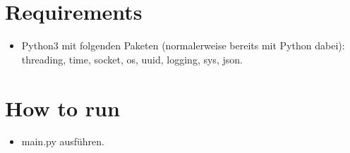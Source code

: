 

\newcommand{\dozent}{Prof. Dr. Matthias Wählisch, Marcin Nawrocki, M.Sc.}
\newcommand{\tutor}{-}
\newcommand{\tutoriumNo}{01\\Materialien: Latex, Python}
\newcommand{\ubungNo}{1}
\newcommand{\veranstaltung}{Telematics Project requirements}
\newcommand{\semester}{WS21/22}
\newcommand{\studenten}{David Ly \& Jonny Lam \& Thore Brehmer}




\section{Requirements}
\begin{itemize}
    \item Python3 mit folgenden Paketen (normalerweise bereits mit Python dabei): threading, time, socket, os, uuid, logging, sys, json.
\end{itemize}

\section{How to run}
\begin{itemize}
    \item main.py ausführen.
\end{itemize}

